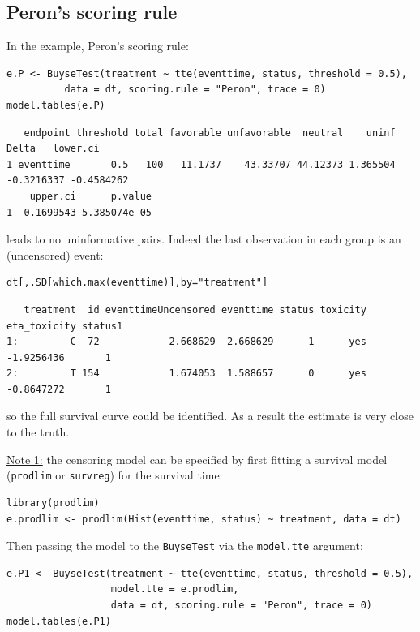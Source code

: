 \documentclass[12pt]{article}
\begin{document}
\subsection{Peron's scoring rule}
\label{sec:org9cf5a0b}
In the example, Peron's scoring rule:
\lstset{language=r,label= ,caption= ,captionpos=b,numbers=none}
\begin{lstlisting}
e.P <- BuyseTest(treatment ~ tte(eventtime, status, threshold = 0.5),
          data = dt, scoring.rule = "Peron", trace = 0)
model.tables(e.P)
\end{lstlisting}

\begin{verbatim}
   endpoint threshold total favorable unfavorable  neutral    uninf      Delta   lower.ci
1 eventtime       0.5   100   11.1737    43.33707 44.12373 1.365504 -0.3216337 -0.4584262
    upper.ci      p.value
1 -0.1699543 5.385074e-05
\end{verbatim}


leads to no uninformative pairs. Indeed the last observation in each
group is an (uncensored) event:
\lstset{language=r,label= ,caption= ,captionpos=b,numbers=none}
\begin{lstlisting}
dt[,.SD[which.max(eventtime)],by="treatment"]
\end{lstlisting}

\begin{verbatim}
   treatment  id eventtimeUncensored eventtime status toxicity eta_toxicity status1
1:         C  72            2.668629  2.668629      1      yes   -1.9256436       1
2:         T 154            1.674053  1.588657      0      yes   -0.8647272       1
\end{verbatim}

so the full survival curve could be identified. As a result the estimate is very close to the
truth. 

\bigskip

\noindent \uline{Note 1:} the censoring model can be specified by first fitting a
survival model (\texttt{prodlim} or \texttt{survreg}) for the survival time:
\lstset{language=r,label= ,caption= ,captionpos=b,numbers=none}
\begin{lstlisting}
library(prodlim)
e.prodlim <- prodlim(Hist(eventtime, status) ~ treatment, data = dt)
\end{lstlisting}

Then passing the model to the \texttt{BuyseTest} via the \texttt{model.tte} argument:
\lstset{language=r,label= ,caption= ,captionpos=b,numbers=none}
\begin{lstlisting}
e.P1 <- BuyseTest(treatment ~ tte(eventtime, status, threshold = 0.5),
                  model.tte = e.prodlim,
                  data = dt, scoring.rule = "Peron", trace = 0)
model.tables(e.P1)
\end{lstlisting}
\end{document}
